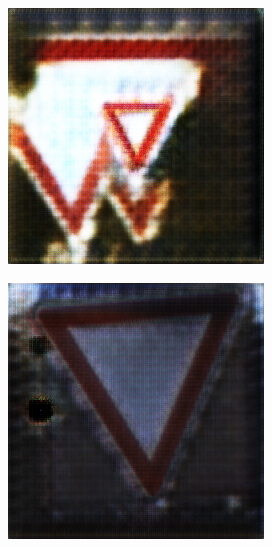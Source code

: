 \documentclass{scrartcl}
\begin{document}
\begin{figure}[h]
\begin{subfigure}[b]{0.13\textwidth}
		\caption{}
		\label{fig:gtrsb-paper-bsp-image-2}
	\end{subfigure}
	\hspace{2em}%
	\begin{subfigure}[b]{0.13\textwidth}
		\centering
		\includegraphics[height=\textwidth]{./images/generierteBilder/c583d04b-f707-4663-a3e3-5deae07c55d7.png}
		\caption{}
		\label{fig:gtrsb-paper-bsp-image-3}
	\end{subfigure}
	\hspace{2em}%
	\begin{subfigure}[b]{0.13\textwidth}
		\centering
		\includegraphics[height=\textwidth]{./images/generierteBilder/e5026964-ec71-4020-9dd4-8324783d4163.png}

\end{subfigure}
\end{figure}
\end{document}
